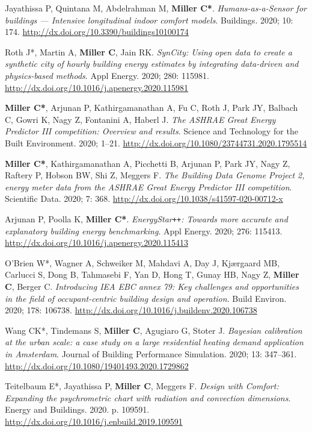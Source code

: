 \documentclass[10pt,a4paper]{article}
\begin{document}
\begin{small}
\begin{etaremune}
Jayathissa P, Quintana M, Abdelrahman M, \textbf{Miller C*}. \emph{Humans-as-a-Sensor for buildings — Intensive longitudinal indoor comfort models}. Buildings. 2020; 10: 174. \url{http://dx.doi.org/10.3390/buildings10100174}%
\item
Roth J*, Martin A, \textbf{Miller C}, Jain RK. \emph{SynCity: Using open data to create a synthetic city of hourly building energy estimates by integrating data-driven and physics-based methods}. Appl Energy. 2020; 280: 115981. \url{http://dx.doi.org/10.1016/j.apenergy.2020.115981}
\item
\textbf{Miller C*}, Arjunan P, Kathirgamanathan A, Fu C, Roth J, Park JY, Balbach C, Gowri K, Nagy Z, Fontanini A, Haberl J.\emph{ The ASHRAE Great Energy Predictor III competition: Overview and results}. Science and Technology for the Built Environment. 2020; 1–21. \url{http://dx.doi.org/10.1080/23744731.2020.1795514}
\item
\textbf{Miller C*}, Kathirgamanathan A, Picchetti B, Arjunan P, Park JY, Nagy Z, Raftery P, Hobson BW, Shi Z, Meggers F. \emph{The Building Data Genome Project 2, energy meter data from the ASHRAE Great Energy Predictor III competition}. Scientific Data. 2020; 7: 368. \url{http://dx.doi.org/10.1038/s41597-020-00712-x}
\item
Arjunan P, Poolla K, \textbf{Miller C*}. \emph{EnergyStar\texttt{+}\texttt{+}: Towards more accurate and explanatory building energy benchmarking}. Appl Energy. 2020; 276: 115413. \url{http://dx.doi.org/10.1016/j.apenergy.2020.115413}
\item
O’Brien W*, Wagner A, Schweiker M, Mahdavi A, Day J, Kjærgaard MB, Carlucci S, Dong B, Tahmasebi F, Yan D, Hong T, Gunay HB, Nagy Z, \textbf{Miller C}, Berger C. \emph{Introducing IEA EBC annex 79: Key challenges and opportunities in the field of occupant-centric building design and operation}. Build Environ. 2020; 178: 106738. \url{http://dx.doi.org/10.1016/j.buildenv.2020.106738}
\item
Wang CK*, Tindemans S, \textbf{Miller C}, Agugiaro G, Stoter J. \emph{Bayesian calibration at the urban scale: a case study on a large residential heating demand application in Amsterdam}. Journal of Building Performance Simulation. 2020; 13: 347–361. \url{http://dx.doi.org/10.1080/19401493.2020.1729862}
\item
Teitelbaum E*, Jayathissa P, \textbf{Miller C}, Meggers F. \emph{Design with Comfort: Expanding the psychrometric chart with radiation and convection dimensions}. Energy and Buildings. 2020. p. 109591. \url{http://dx.doi.org/10.1016/j.enbuild.2019.109591}

\end{etaremune}
\end{small}
\end{document}
